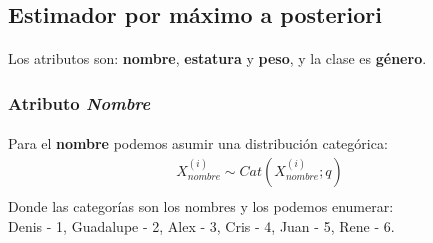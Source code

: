 \documentclass[12pt]{article}
\begin{document}
 \subsection{Estimador por máximo a posteriori}
 \paragraph{}Los atributos son: \textbf{nombre}, \textbf{estatura} y \textbf{peso}, y la clase es \textbf{género}.\\
 \subsubsection{Atributo \textit{Nombre}}
 \paragraph{} Para el \textbf{nombre} podemos asumir una distribución categórica:
 \begin{equation}
 \begin{split}
 X_{nombre}^{(i)}\sim Cat(X_{nombre}^{(i)};q)\\
 \end{split}
 \end{equation}
 Donde las categorías son los nombres y los podemos enumerar:\\
 Denis - 1, Guadalupe - 2, Alex - 3, Cris - 4, Juan - 5, Rene - 6.\\
\end{document}

